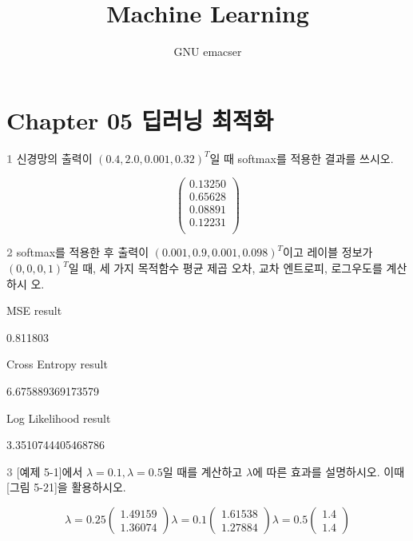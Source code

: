 \documentclass [12pt] {oblivoir}
\title{Machine Learning}
\author{GNU emacser}
\date{}
\begin{document}
\maketitle

\newpage
\tableofcontents

\section {Chapter 05 딥러닝 최적화}

\textbf{\textcolor{gray}{1}} 신경망의 출력이 $(0.4, 2.0, 0.001, 0.32)^{T}$일 때 softmax를 적용한 결과를 쓰시오.

\begin{equation*}
  \begin{pmatrix}
    0.13250 \\
    0.65628\\
    0.08891\\
    0.12231 \\
  \end{pmatrix}
\end{equation*}

\textbf{\textcolor{gray}{2}} softmax를 적용한 후 출력이 $(0.001, 0.9, 0.001, 0.098)^{T}$이고 레이블 정보가 $(0, 0, 0, 1)^{T}$일 때, 세 가지 목적함수 평균 제곱 오차, 교차 엔트로피, 로그우도를 계산하시
오.

\begin{center}
MSE result

\vspace{2mm}
0.811803

\vspace{5mm}
Cross Entropy result

\vspace{2mm}
6.675889369173579

\vspace{5mm}
Log Likelihood result

\vspace{2mm}
3.3510744405468786
\end{center}

\textbf{\textcolor{gray}{3}} [예제 5-1]에서 $\lambda = 0.1, \lambda = 0.5$일 때를 계산하고 $\lambda$에 따른 효과를 설명하시오. 이때 [그림 5-21]을 활용하시오.

\begin{equation*}
  \lambda = 0.25
  \begin{pmatrix}
    1.49159 \\
    1.36074
  \end{pmatrix}
  \lambda = 0.1
  \begin{pmatrix}
    1.61538 \\
    1.27884
  \end{pmatrix}
  \lambda = 0.5
  \begin{pmatrix}
    1.4 \\
    1.4
  \end{pmatrix}
\end{equation*}
\end{document}
